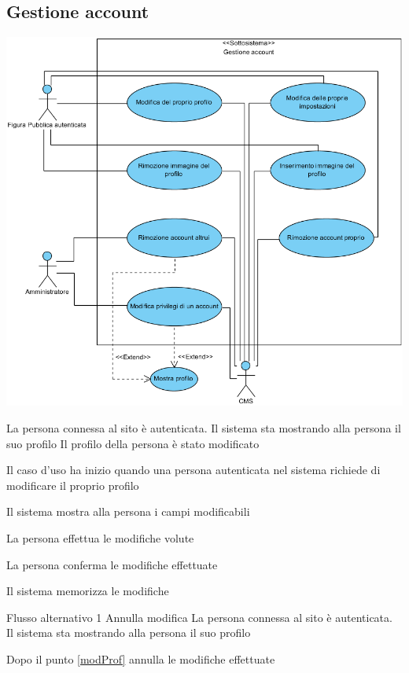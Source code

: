 \subsection{Gestione account}
\begin{center}
   \includegraphics[width=\textwidth]{assets/visualParadigm/cu/GestioneAccount}
\end{center}
{}
{La persona connessa al sito è autenticata. Il sistema sta mostrando alla persona il suo profilo}
{Il profilo della persona è stato modificato}
{\begin{enumCU}
	\item Il caso d'uso ha inizio quando una persona autenticata nel sistema richiede di modificare il proprio profilo
	\item Il sistema mostra alla persona i campi modificabili
	\item La persona effettua le modifiche volute\label{modProf}
	\item La persona conferma le modifiche effettuate
	\item Il sistema memorizza le modifiche
\end{enumCU}}
%
{Flusso alternativo 1}%
{Annulla modifica}%
{La persona connessa al sito è autenticata. Il sistema sta mostrando alla persona il suo profilo}
{\postNulle}%
{\begin{enumCU}
	\item Dopo il punto \ref{modProf} annulla le modifiche effettuate
\end{enumCU}}%

